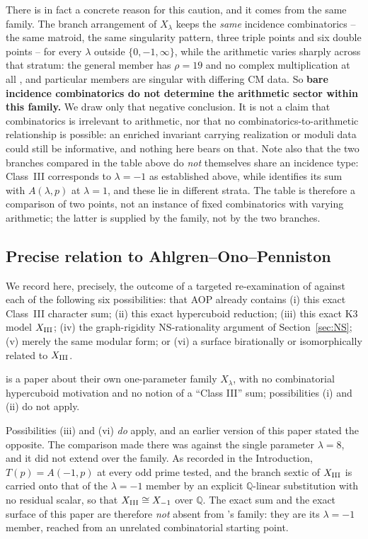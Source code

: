 \documentclass[11pt]{amsart}
\theoremstyle{definition}
\newcommand{\Q}{\mathbb{Q}}
\newcommand{\NS}{\mathrm{NS}}
\begin{document}
There is in fact a concrete reason for this caution, and it comes from
the same family. The branch arrangement of $X_\lambda$ keeps the
\emph{same} incidence combinatorics -- the same matroid, the same
singularity pattern, three triple points and six double points -- for
every $\lambda$ outside $\{0,-1,\infty\}$, while the arithmetic varies
sharply across that stratum: the general member has $\rho=19$ and no
complex multiplication at all \cite{vanGeemenTop2006}, and particular
members are singular with differing CM data. So \textbf{bare incidence
combinatorics do not determine the arithmetic sector within this family.}
We draw only that negative conclusion. It is not a claim that
combinatorics is irrelevant to arithmetic, nor that no
combinatorics-to-arithmetic relationship is possible: an enriched
invariant carrying realization or moduli data could still be informative,
and nothing here bears on that. Note also that the two branches compared
in the table above do \emph{not} themselves share an incidence type:
Class~III corresponds to $\lambda=-1$ as established above, while
\cite{ClassesI_II} identifies its sum with $A(\lambda,p)$ at $\lambda=1$,
and these lie in different strata. The table is therefore a comparison of
two points, not an instance of fixed combinatorics with varying
arithmetic; the latter is supplied by the family, not by the two
branches.

\subsection{Precise relation to Ahlgren--Ono--Penniston}
\label{sec:AOP-precise}

We record here, precisely, the outcome of a targeted re-examination of
\cite{AOP2002} against each of the following six possibilities: that AOP
already contains (i) this exact Class~III character sum; (ii) this exact
hypercuboid reduction; (iii) this exact K3 model $X_{\rm III}$; (iv) the
graph-rigidity $\NS$-rationality argument of Section~\ref{sec:NS}; (v)
merely the same modular form; or (vi) a surface birationally or
isomorphically related to $X_{\rm III}$.

\cite{AOP2002} is a paper about their own one-parameter family
$X_\lambda$, with no combinatorial hypercuboid motivation and no notion
of a ``Class III'' sum; possibilities (i) and (ii) do not apply.

Possibilities (iii) and (vi) \emph{do} apply, and an earlier version of
this paper stated the opposite. The comparison made there was against the
single parameter $\lambda=8$, and it did not extend over the family. As
recorded in the Introduction, $T(p)=A(-1,p)$ at every odd prime tested,
and the branch sextic of $X_{\rm III}$ is carried onto that of the
$\lambda=-1$ member by an explicit $\Q$-linear substitution with no
residual scalar, so that $X_{\rm III}\cong X_{-1}$ over $\Q$. The exact
sum and the exact surface of this paper are therefore \emph{not} absent
from \cite{AOP2002}'s family: they are its $\lambda=-1$ member, reached
from an unrelated combinatorial starting point.
\end{document}
